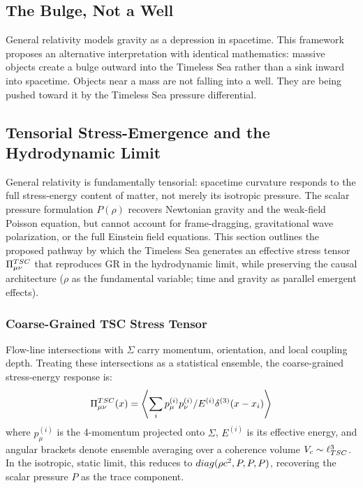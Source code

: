 \documentclass[11pt,a4paper]{article}
\def\frac#1#2{#1/#2} \def\phantom#1{} \def\ensuremath#1{#1}
\let\text\relax \let\mathrm\relax \let\mathbf\relax \let\mathcal\relax
\begin{document}
\subsection{The Bulge, Not a Well}
General relativity models gravity as a depression in spacetime. This framework proposes an alternative interpretation with identical mathematics: massive objects create a bulge outward into the Timeless Sea rather than a sink inward into spacetime. Objects near a mass are not falling into a well. They are being pushed toward it by the Timeless Sea pressure differential.

\subsection{Tensorial Stress-Emergence and the Hydrodynamic Limit}
General relativity is fundamentally tensorial: spacetime curvature responds to the full stress-energy content of matter, not merely its isotropic pressure. The scalar pressure formulation $P(\rho)$ recovers Newtonian gravity and the weak-field Poisson equation, but cannot account for frame-dragging, gravitational wave polarization, or the full Einstein field equations. This section outlines the proposed pathway by which the Timeless Sea generates an effective stress tensor $\Pi_{\mu\nu}^{\text{TSC}}$ that reproduces GR in the hydrodynamic limit, while preserving the causal architecture ($\rho$ as the fundamental variable; time and gravity as parallel emergent effects).

\subsubsection*{Coarse-Grained TSC Stress Tensor}
Flow-line intersections with $\Sigma$ carry momentum, orientation, and local coupling depth. Treating these intersections as a statistical ensemble, the coarse-grained stress-energy response is:
\begin{equation}
\Pi_{\mu\nu}^{\text{TSC}}(x) = \left\langle \sum_{i} \frac{p_{\mu}^{(i)} p_{\nu}^{(i)}}{E^{(i)}} \delta^{(3)}(\mathbf{x} - \mathbf{x}_i) \right\rangle
\end{equation}
where $p_{\mu}^{(i)}$ is the 4-momentum projected onto $\Sigma$, $E^{(i)}$ is its effective energy, and angular brackets denote ensemble averaging over a coherence volume $V_c \sim \ell_{\text{TSC}}^3$. In the isotropic, static limit, this reduces to $\text{diag}(\rho c^2, P, P, P)$, recovering the scalar pressure $P$ as the trace component.
\end{document}
